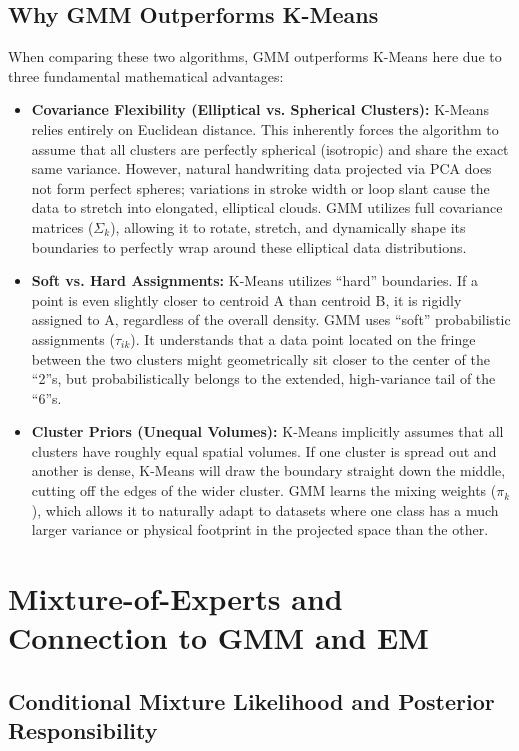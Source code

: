 \documentclass[twoside, 10pt]{article}
\begin{document}
\subsection*{Why GMM Outperforms K-Means}
When comparing these two algorithms, GMM outperforms K-Means here due to three fundamental mathematical advantages:
\begin{itemize}
    \item \textbf{Covariance Flexibility (Elliptical vs. Spherical Clusters):} K-Means relies entirely on Euclidean distance. This inherently forces the algorithm to assume that all clusters are perfectly spherical (isotropic) and share the exact same variance. However, natural handwriting data projected via PCA does not form perfect spheres; variations in stroke width or loop slant cause the data to stretch into elongated, elliptical clouds. GMM utilizes full covariance matrices ($\Sigma_k$), allowing it to rotate, stretch, and dynamically shape its boundaries to perfectly wrap around these elliptical data distributions.
    \item \textbf{Soft vs. Hard Assignments:} K-Means utilizes ``hard'' boundaries. If a point is even slightly closer to centroid A than centroid B, it is rigidly assigned to A, regardless of the overall density. GMM uses ``soft'' probabilistic assignments ($\tau_{ik}$). It understands that a data point located on the fringe between the two clusters might geometrically sit closer to the center of the ``2''s, but probabilistically belongs to the extended, high-variance tail of the ``6''s. 
    \item \textbf{Cluster Priors (Unequal Volumes):} K-Means implicitly assumes that all clusters have roughly equal spatial volumes. If one cluster is spread out and another is dense, K-Means will draw the boundary straight down the middle, cutting off the edges of the wider cluster. GMM learns the mixing weights ($\pi_k$), which allows it to naturally adapt to datasets where one class has a much larger variance or physical footprint in the projected space than the other.
\end{itemize}

\section{Mixture-of-Experts and Connection to GMM and EM}
\subsection{Conditional Mixture Likelihood and Posterior Responsibility}
\end{document}
